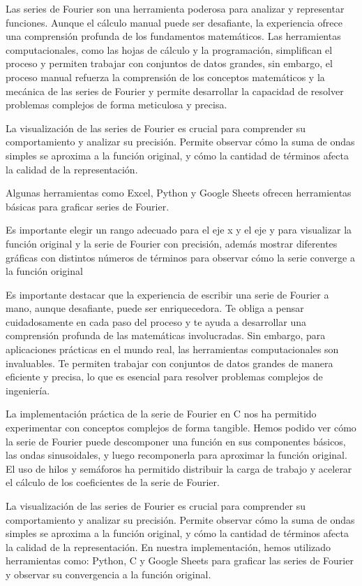 Las series de Fourier son una herramienta poderosa para analizar y representar funciones. Aunque el cálculo manual puede ser desafiante, la experiencia ofrece una comprensión profunda de los fundamentos matemáticos. Las herramientas computacionales, como las hojas de cálculo y la programación, simplifican el proceso y permiten trabajar con conjuntos de datos grandes, sin embargo, el proceso manual refuerza la comprensión de los conceptos matemáticos y la mecánica de las series de Fourier y permite desarrollar la capacidad de resolver problemas complejos de forma meticulosa y precisa.

La visualización de las series de Fourier es crucial para comprender su comportamiento y analizar su precisión. Permite observar cómo la suma de ondas simples se aproxima a la función original, y cómo la cantidad de términos afecta la calidad de la representación.

Algunas herramientas como Excel, Python y Google Sheets ofrecen herramientas básicas para graficar series de Fourier.

Es importante elegir un rango adecuado para el eje x y el eje y para visualizar la función original y la serie de Fourier con precisión, además mostrar diferentes gráficas con distintos números de términos para observar cómo la serie converge a la función original

Es importante destacar que la experiencia de escribir una serie de Fourier a mano, aunque desafiante, puede ser enriquecedora. Te obliga a pensar cuidadosamente en cada paso del proceso y te ayuda a desarrollar una comprensión profunda de las matemáticas involucradas. Sin embargo, para aplicaciones prácticas en el mundo real, las herramientas computacionales son invaluables. Te permiten trabajar con conjuntos de datos grandes de manera eficiente y precisa, lo que es esencial para resolver problemas complejos de ingeniería.

La implementación práctica de la serie de Fourier en C nos ha permitido experimentar con conceptos complejos de forma tangible. Hemos podido ver cómo la serie de Fourier puede descomponer una función en sus componentes básicos, las ondas sinusoidales, y luego recomponerla para aproximar la función original. El uso de hilos y semáforos ha permitido distribuir la carga de trabajo y acelerar el cálculo de los coeficientes de la serie de Fourier.

La visualización de las series de Fourier es crucial para comprender su comportamiento y analizar su precisión. Permite observar cómo la suma de ondas simples se aproxima a la función original, y cómo la cantidad de términos afecta la calidad de la representación. En nuestra implementación, hemos utilizado herramientas como: Python, C y Google Sheets para graficar las series de Fourier y observar su convergencia a la función original.

